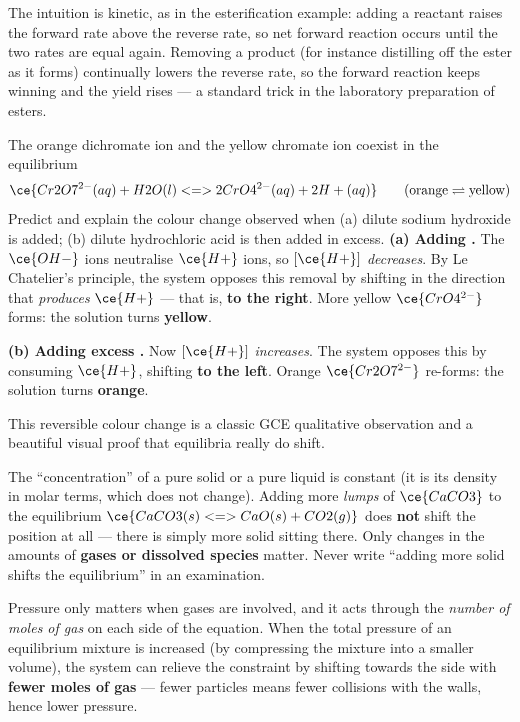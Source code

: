 \documentclass[11pt]{article}
\newcounter{popsec}
\newcounter{popsub}
\newcommand{\courssub}[1]{%
  \stepcounter{popsub}%
  \par\vspace{9pt}\noindent{\popxbold\fontsize{11.5}{13}\selectfont\color{popink}{\color{poporange}\thepopsec.\thepopsub}\hspace{6pt}#1}\par\nopagebreak\vspace{4pt}
}
\begin{document}
The intuition is kinetic, as in the esterification example: adding a reactant raises the forward rate above the reverse rate, so net forward reaction occurs until the two rates are equal again. Removing a product (for instance distilling off the ester as it forms) continually lowers the reverse rate, so the forward reaction keeps winning and the yield rises --- a standard trick in the laboratory preparation of esters.

\begin{exoresolu}
The orange dichromate ion and the yellow chromate ion coexist in the equilibrium
\[
\ce{Cr2O7^{2-}(aq) + H2O(l) <=> 2CrO4^{2-}(aq) + 2H+(aq)} \qquad \text{(orange} \rightleftharpoons \text{yellow)}
\]
Predict and explain the colour change observed when (a) dilute sodium hydroxide is added; (b) dilute hydrochloric acid is then added in excess.
\tcblower
\textbf{(a) Adding .} The $\ce{OH-}$ ions neutralise $\ce{H+}$ ions, so $[\ce{H+}]$ \emph{decreases}. By Le Chatelier's principle, the system opposes this removal by shifting in the direction that \emph{produces} $\ce{H+}$ --- that is, \textbf{to the right}. More yellow $\ce{CrO4^{2-}}$ forms: the solution turns \textbf{yellow}.

\textbf{(b) Adding excess .} Now $[\ce{H+}]$ \emph{increases}. The system opposes this by consuming $\ce{H+}$, shifting \textbf{to the left}. Orange $\ce{Cr2O7^{2-}}$ re-forms: the solution turns \textbf{orange}.

This reversible colour change is a classic GCE qualitative observation and a beautiful visual proof that equilibria really do shift.
\end{exoresolu}

\begin{attention}
The ``concentration'' of a pure solid or a pure liquid is constant (it is its density in molar terms, which does not change). Adding more \emph{lumps} of $\ce{CaCO3}$ to the equilibrium $\ce{CaCO3(s) <=> CaO(s) + CO2(g)}$ does \textbf{not} shift the position at all --- there is simply more solid sitting there. Only changes in the amounts of \textbf{gases or dissolved species} matter. Never write ``adding more solid shifts the equilibrium'' in an examination.
\end{attention}

\courssub{Effect of Changing Pressure (Gaseous Systems)}

Pressure only matters when gases are involved, and it acts through the \emph{number of moles of gas} on each side of the equation. When the total pressure of an equilibrium mixture is increased (by compressing the mixture into a smaller volume), the system can relieve the constraint by shifting towards the side with \textbf{fewer moles of gas} --- fewer particles means fewer collisions with the walls, hence lower pressure.
\end{document}
